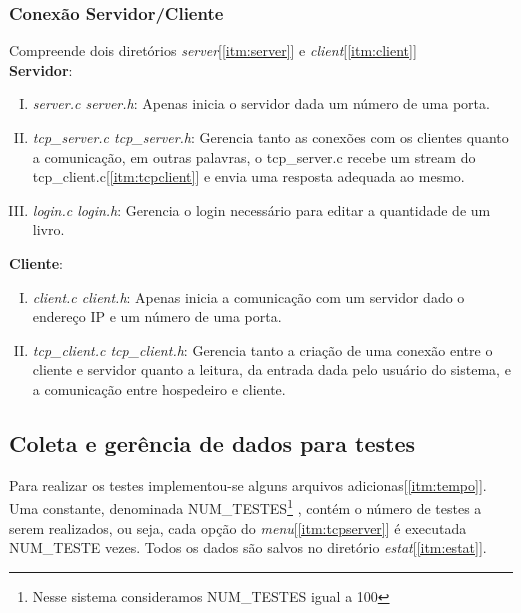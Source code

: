 \documentclass[a4paper,10pt]{article}
\begin{document}
\subsubsection{Conexão Servidor/Cliente}
Compreende dois diretórios \emph{server}[\ref{itm:server}] e \emph{client}[\ref{itm:client}]
\\\textbf{Servidor}:
\begin{enumerate}[I.]
\item \emph{server.c server.h}: Apenas inicia o servidor dada um número de uma porta.
\item \label{itm:tcpserver} \emph{tcp\_server.c tcp\_server.h}: Gerencia tanto as conexões com os clientes quanto a comunicação, em outras palavras, o tcp\_server.c recebe um stream do tcp\_client.c[\ref{itm:tcpclient}] e envia uma resposta adequada ao mesmo.
\item \emph{login.c login.h}: Gerencia o login necessário para editar a quantidade de um livro.
\end{enumerate}
\textbf{Cliente}:
\begin{enumerate}[I.]
\item \emph{client.c client.h}: Apenas inicia a comunicação com um servidor dado o endereço IP e um número de uma porta.
\item \label{itm:tcpclient} \emph{tcp\_client.c tcp\_client.h}: Gerencia tanto 
a criação de uma conexão entre o cliente e servidor quanto a leitura, da entrada dada pelo usuário do sistema, e a comunicação entre hospedeiro e cliente.
\end{enumerate}
\subsection{Coleta e gerência de dados para testes}
Para realizar os testes implementou-se alguns arquivos adicionas[\ref{itm:tempo}]. Uma constante, denominada NUM\_TESTES\footnote{Nesse sistema consideramos NUM\_TESTES igual a 100} , contém o número de testes a serem realizados, ou seja, cada opção do \emph{menu}[\ref{itm:tcpserver}] é executada NUM\_TESTE vezes. Todos os dados são 
salvos no diretório \emph{estat}[\ref{itm:estat}].
\end{document}
